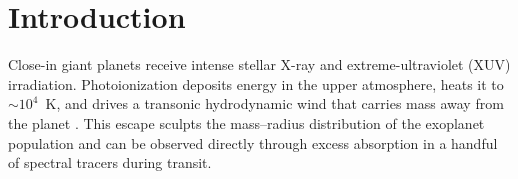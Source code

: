 \documentclass[twocolumn]{aastex702}
\newcommand{\Mdot}{\dot{M}}
\newcommand{\Lya}{\mbox{Ly}\ensuremath{\alpha}}
\newcommand{\Ha}{\mbox{H}\ensuremath{\alpha}}
\begin{document}
\begin{abstract}
$\log_{10}(\Mdot/{\rm g\,s^{-1}})\approx9.0$--$13.2$, from the compact
HD~189733~b wind to the strongly irradiated WASP-121~b, with thermosphere
temperature maxima of $\sim0.8$--$1.2\times10^{4}$~K.
The
synthetic depths range from sub-percent \Ha\ on the quieter targets to tens of
percent in \mbox{He\,10830} and \Lya, and are compared line by line with
published measurements; the model reproduces the order of magnitude of the
observed \mbox{He\,10830}, \Ha, and \Lya\ absorption on the two cooler targets,
over-predicts the WASP-52~b depths, and on WASP-121~b saturates against the
truncation of the modeled domain, motivating the composition and
domain refinements discussed in the text.
\end{abstract}


\section{Introduction}
\label{sec:intro}

Close-in giant planets receive intense stellar X-ray and extreme-ultraviolet (XUV)
irradiation. Photoionization deposits energy in the upper atmosphere, heats it to
$\sim10^4$~K, and drives a transonic hydrodynamic wind that carries mass away from the
planet \citep{Parker1958,MurrayClay2009}. This escape sculpts the mass--radius
distribution of the exoplanet population and can be observed directly through excess
absorption in a handful of spectral tracers during transit.
\end{document}

